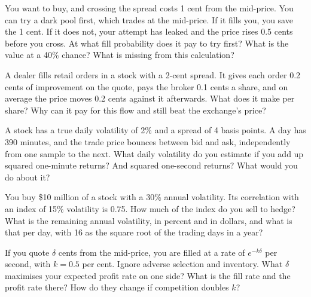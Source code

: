\begin{question}\label{iq:iv2:markets-and-microstructure:27}
You want to buy, and crossing the spread costs 1 cent from the mid-price. You can try a dark pool first, which trades at the mid-price. If it fills you, you save the 1 cent. If it does not, your attempt has leaked and the price rises 0.5 cents before you cross. At what fill probability does it pay to try first? What is the value at a 40\% chance? What is missing from this calculation?
\end{question}

\begin{question}\label{iq:iv2:markets-and-microstructure:28}
A dealer fills retail orders in a stock with a 2-cent spread. It gives each order 0.2 cents of improvement on the quote, pays the broker 0.1 cents a share, and on average the price moves 0.2 cents against it afterwards. What does it make per share? Why can it pay for this flow and still beat the exchange's price?
\end{question}

\begin{question}\label{iq:iv2:markets-and-microstructure:29}
A stock has a true daily volatility of 2\% and a spread of 4 basis points. A day has 390 minutes, and the trade price bounces between bid and ask, independently from one sample to the next. What daily volatility do you estimate if you add up squared one-minute returns? And squared one-second returns? What would you do about it?
\end{question}

\begin{question}\label{iq:iv2:markets-and-microstructure:30}
You buy \$10 million of a stock with a 30\% annual volatility. Its correlation with an index of 15\% volatility is 0.75. How much of the index do you sell to hedge? What is the remaining annual volatility, in percent and in dollars, and what is that per day, with 16 as the square root of the trading days in a year?
\end{question}

\begin{question}\label{iq:iv2:markets-and-microstructure:31}
If you quote $\delta$ cents from the mid-price, you are filled at a rate of $e^{-k\delta}$ per second, with $k = 0.5$ per cent. Ignore adverse selection and inventory. What $\delta$ maximises your expected profit rate on one side? What is the fill rate and the profit rate there? How do they change if competition doubles $k$?
\end{question}


